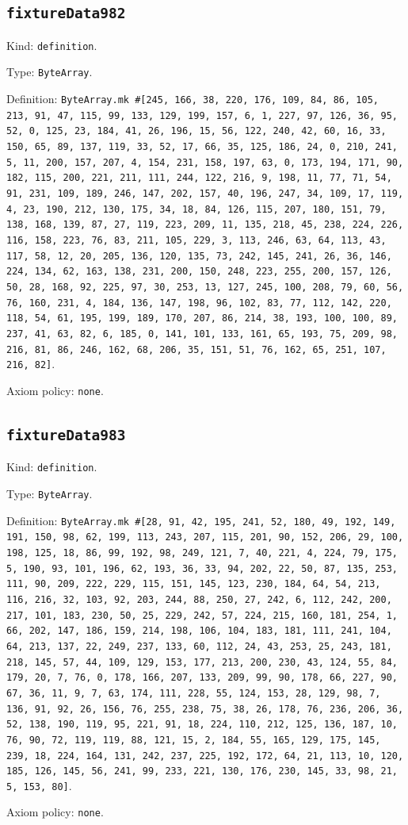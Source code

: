 \documentclass[11pt]{article}
\begin{document}
\subsection*{\texttt{fixtureData982}}
\noindent Kind: \texttt{definition}.\par
\noindent Type: \texttt{ByteArray}.\par
\noindent Definition: \texttt{ByteArray.mk \#[245, 166, 38, 220, 176, 109, 84, 86, 105, 213, 91, 47, 115, 99, 133, 129, 199, 157, 6, 1, 227, 97, 126, 36, 95, 52, 0, 125, 23, 184, 41, 26, 196, 15, 56, 122, 240, 42, 60, 16, 33, 150, 65, 89, 137, 119, 33, 52, 17, 66, 35, 125, 186, 24, 0, 210, 241, 5, 11, 200, 157, 207, 4, 154, 231, 158, 197, 63, 0, 173, 194, 171, 90, 182, 115, 200, 221, 211, 111, 244, 122, 216, 9, 198, 11, 77, 71, 54, 91, 231, 109, 189, 246, 147, 202, 157, 40, 196, 247, 34, 109, 17, 119, 4, 23, 190, 212, 130, 175, 34, 18, 84, 126, 115, 207, 180, 151, 79, 138, 168, 139, 87, 27, 119, 223, 209, 11, 135, 218, 45, 238, 224, 226, 116, 158, 223, 76, 83, 211, 105, 229, 3, 113, 246, 63, 64, 113, 43, 117, 58, 12, 20, 205, 136, 120, 135, 73, 242, 145, 241, 26, 36, 146, 224, 134, 62, 163, 138, 231, 200, 150, 248, 223, 255, 200, 157, 126, 50, 28, 168, 92, 225, 97, 30, 253, 13, 127, 245, 100, 208, 79, 60, 56, 76, 160, 231, 4, 184, 136, 147, 198, 96, 102, 83, 77, 112, 142, 220, 118, 54, 61, 195, 199, 189, 170, 207, 86, 214, 38, 193, 100, 100, 89, 237, 41, 63, 82, 6, 185, 0, 141, 101, 133, 161, 65, 193, 75, 209, 98, 216, 81, 86, 246, 162, 68, 206, 35, 151, 51, 76, 162, 65, 251, 107, 216, 82]}.\par
\noindent Axiom policy: \texttt{none}.\par
\subsection*{\texttt{fixtureData983}}
\noindent Kind: \texttt{definition}.\par
\noindent Type: \texttt{ByteArray}.\par
\noindent Definition: \texttt{ByteArray.mk \#[28, 91, 42, 195, 241, 52, 180, 49, 192, 149, 191, 150, 98, 62, 199, 113, 243, 207, 115, 201, 90, 152, 206, 29, 100, 198, 125, 18, 86, 99, 192, 98, 249, 121, 7, 40, 221, 4, 224, 79, 175, 5, 190, 93, 101, 196, 62, 193, 36, 33, 94, 202, 22, 50, 87, 135, 253, 111, 90, 209, 222, 229, 115, 151, 145, 123, 230, 184, 64, 54, 213, 116, 216, 32, 103, 92, 203, 244, 88, 250, 27, 242, 6, 112, 242, 200, 217, 101, 183, 230, 50, 25, 229, 242, 57, 224, 215, 160, 181, 254, 1, 66, 202, 147, 186, 159, 214, 198, 106, 104, 183, 181, 111, 241, 104, 64, 213, 137, 22, 249, 237, 133, 60, 112, 24, 43, 253, 25, 243, 181, 218, 145, 57, 44, 109, 129, 153, 177, 213, 200, 230, 43, 124, 55, 84, 179, 20, 7, 76, 0, 178, 166, 207, 133, 209, 99, 90, 178, 66, 227, 90, 67, 36, 11, 9, 7, 63, 174, 111, 228, 55, 124, 153, 28, 129, 98, 7, 136, 91, 92, 26, 156, 76, 255, 238, 75, 38, 26, 178, 76, 236, 206, 36, 52, 138, 190, 119, 95, 221, 91, 18, 224, 110, 212, 125, 136, 187, 10, 76, 90, 72, 119, 119, 88, 121, 15, 2, 184, 55, 165, 129, 175, 145, 239, 18, 224, 164, 131, 242, 237, 225, 192, 172, 64, 21, 113, 10, 120, 185, 126, 145, 56, 241, 99, 233, 221, 130, 176, 230, 145, 33, 98, 21, 5, 153, 80]}.\par
\noindent Axiom policy: \texttt{none}.\par
\end{document}
